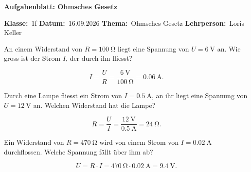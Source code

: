 \pagestyle{headandfoot}

\newcommand{\Kopfzeile}[4]{%
  \begin{titlebox}
    {\color{white}\sffamily\bfseries\Large #4}
  \end{titlebox}
  \vspace{0.5em}
  \noindent\textbf{Klasse:}~#1 \hfill \textbf{Datum:}~#2 \hfill \textbf{Thema:}~#3
    \hfill \textbf{Lehrperson:}~Loris Keller
  \vspace{0.8em}
  \lhead{\textcolor{darkgray}{#3}}
  \rhead{\textcolor{darkgray}{#4}}
}

\newlength{\antwortraumlen}
\newcommand{\Antwortraum}[1]{%
  \pgfmathsetlength{\antwortraumlen}{#1*2.5cm}%
  \begin{answerbox}
    \rule{0pt}{\antwortraumlen}%
  \end{answerbox}%
}

\newcommand{\Klasse}{1f}
\newcommand{\Datum}{16.09.2026}
\newcommand{\Thema}{Ohmsches Gesetz}
\newcommand{\ArbeitsblattTitel}{Aufgabenblatt: Ohmsches Gesetz}



\Kopfzeile{\Klasse}{\Datum}{\Thema}{\ArbeitsblattTitel}

\begin{questions}
\begin{taskbox}
\question[2] An einem Widerstand von $R=\SI{100}{\ohm}$ liegt eine Spannung
von $U=\SI{6}{\volt}$ an. Wie gross ist der Strom $I$, der durch ihn
fliesst?
\Antwortraum{2}
\begin{solution}
\[
  I = \frac{U}{R} = \frac{\SI{6}{\volt}}{\SI{100}{\ohm}} = \SI{0.06}{\ampere}.
\]
\end{solution}

\question[2] Durch eine Lampe fliesst ein Strom von $I=\SI{0.5}{\ampere}$,
an ihr liegt eine Spannung von $U=\SI{12}{\volt}$ an. Welchen Widerstand
hat die Lampe?
\Antwortraum{2}
\begin{solution}
\[
  R = \frac{U}{I} = \frac{\SI{12}{\volt}}{\SI{0.5}{\ampere}} = \SI{24}{\ohm}.
\]
\end{solution}

\question[2] Ein Widerstand von $R=\SI{470}{\ohm}$ wird von einem Strom
von $I=\SI{0.02}{\ampere}$ durchflossen. Welche Spannung fällt über ihm
ab?
\Antwortraum{2}
\begin{solution}
\[
  U = R\cdot I = \SI{470}{\ohm}\cdot\SI{0.02}{\ampere} = \SI{9.4}{\volt}.
\]
\end{solution}
\end{taskbox}
\end{questions}

